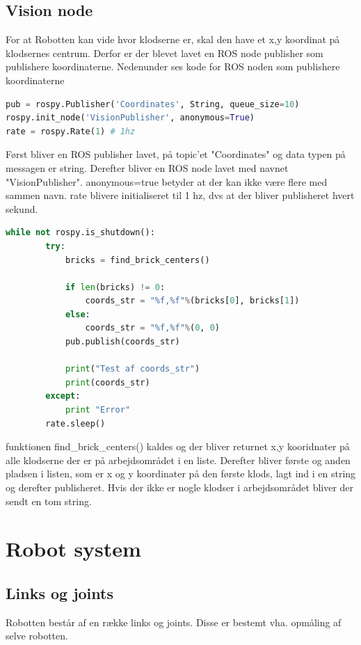 \subsection{Vision node}
For at Robotten kan vide hvor klodserne er, skal den have et x,y koordinat på klodsernes centrum.
Derfor er der blevet lavet en ROS node publisher som publishere koordinaterne.
Nedenunder ses kode for ROS noden som publishere koordinaterne \newline
\begin{lstlisting}[language=python]
pub = rospy.Publisher('Coordinates', String, queue_size=10)
rospy.init_node('VisionPublisher', anonymous=True)
rate = rospy.Rate(1) # 1hz
\end{lstlisting}
Først bliver en ROS publisher lavet, på topic'et "Coordinates" og data typen på messagen er string.
Derefter bliver en ROS node lavet med navnet "VisionPublisher". anonymous=true betyder at der kan ikke være flere med sammen navn.
rate blivere initialiseret til 1 hz, dvs at der bliver publisheret hvert sekund. \newline
\begin{lstlisting}[language=python]
while not rospy.is_shutdown():
        try:
            bricks = find_brick_centers()
            
            if len(bricks) != 0:        
                coords_str = "%f,%f"%(bricks[0], bricks[1])
            else:
                coords_str = "%f,%f"%(0, 0)          
            pub.publish(coords_str)
            
            print("Test af coords_str")
            print(coords_str)
        except:
            print "Error"
        rate.sleep()
\end{lstlisting}
funktionen find\_brick\_centers() kaldes og der bliver returnet x,y kooridnater på alle klodserne der er på arbejdsområdet i en liste.
Derefter bliver første og anden pladsen i listen, som er x og y koordinater på den første klods, lagt ind i en string og derefter publisheret.
Hvis der ikke er nogle klodser i arbejdsområdet bliver der sendt en tom string.


\section{Robot system}
\subsection{Links og joints}
Robotten består af en række links og joints. Disse er bestemt vha. opmåling af selve robotten. 

